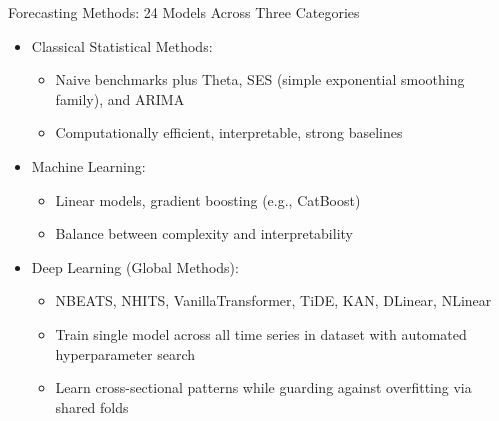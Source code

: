 \documentclass[ignorenonframetext, 9pt]{beamer}
\begin{document}
\begin{frame}{Forecasting Methods: 24 Models Across Three Categories}
\begin{itemize}
\item \alert{Classical Statistical Methods:}
\begin{itemize}
  \item Naive benchmarks plus Theta, SES (simple exponential smoothing family), and ARIMA
  \item Computationally efficient, interpretable, strong baselines
\end{itemize}
\vspace{0.3cm}
\item \alert{Machine Learning:}
\begin{itemize}
  \item Linear models, gradient boosting (e.g., CatBoost)
  \item Balance between complexity and interpretability
\end{itemize}
\vspace{0.3cm}
\item \alert{Deep Learning (Global Methods):}
\begin{itemize}
  \item NBEATS, NHITS, VanillaTransformer, TiDE, KAN, DLinear, NLinear
  \item Train single model across all time series in dataset with automated hyperparameter search
  \item Learn cross-sectional patterns while guarding against overfitting via shared folds
\end{itemize}
\end{itemize}
\end{frame}
\end{document}
